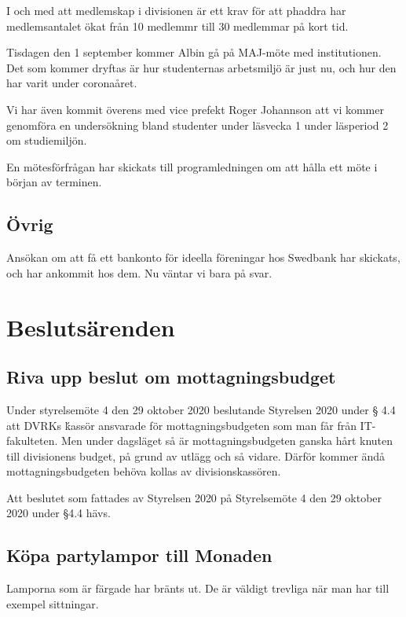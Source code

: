 \documentclass[protokoll]{dvd}
\begin{document}
I och med att medlemskap i divisionen är ett krav för att phaddra har medlemsantalet ökat från 10 medlemmr till 30 medlemmar på kort tid.

Tisdagen den 1 september kommer Albin gå på MAJ-möte med institutionen.
Det som kommer dryftas är hur studenternas arbetsmiljö är just nu, och hur den har varit under coronaåret.

Vi har även kommit överens med vice prefekt Roger Johannson att vi kommer genomföra en undersökning bland studenter under läsvecka 1 under läsperiod 2 om studiemiljön.

En mötesförfrågan har skickats till programledningen om att hålla ett möte i början av terminen.

\subsection{Övrig}

Ansökan om att få ett bankonto för ideella föreningar hos Swedbank har skickats, och har ankommit hos dem.
Nu väntar vi bara på svar.

\section{Beslutsärenden}

\subsection{Riva upp beslut om mottagningsbudget}

Under styrelsemöte 4 den 29 oktober 2020 beslutande Styrelsen 2020 under § 4.4 att DVRKs ḱassör ansvarade för mottagningsbudgeten som man får från IT-fakulteten.
Men under dagsläget så är mottagningsbudgeten ganska hårt knuten till divisionens budget, på grund av utlägg och så vidare.
Därför kommer ändå mottagningsbudgeten behöva kollas av divisionskassören.

\begin{beslut}
    \item Att beslutet som fattades av Styrelsen 2020 på Styrelsemöte 4 den 29 oktober 2020 under §4.4 hävs.
\end{beslut}

\subsection{Köpa partylampor till Monaden}

Lamporna som är färgade har bränts ut.
De är väldigt trevliga när man har till exempel sittningar.
\end{document}
